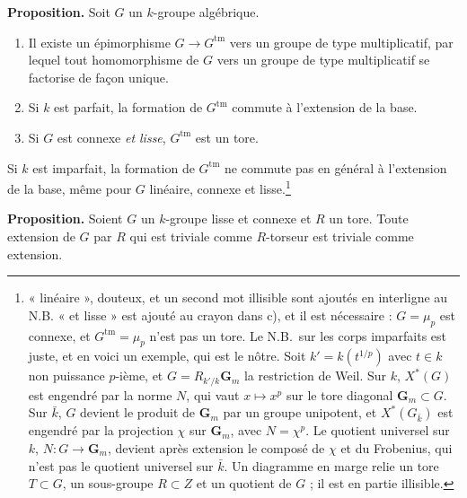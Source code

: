 \documentclass[11pt,a4paper]{article}
\begin{document}
\textbf{Proposition.} Soit $G$ un $k$-groupe algébrique.
\begin{enumerate}
\item[a)] Il existe un épimorphisme $G \to G^{\mathrm{tm}}$ vers un groupe de
type multiplicatif, par lequel tout homomorphisme de $G$ vers un groupe de
type multiplicatif se factorise de façon unique.
\item[b)] Si $k$ est parfait, la formation de $G^{\mathrm{tm}}$ commute à
l'extension de la base.
\item[c)] Si $G$ est connexe \emph{et lisse}, $G^{\mathrm{tm}}$ est un tore.
\end{enumerate}
Si $k$ est imparfait, la formation de $G^{\mathrm{tm}}$ ne commute pas en
général à l'extension de la base, même pour $G$ linéaire, connexe et
lisse.\footnote{« linéaire », douteux, et un second mot illisible sont
ajoutés en interligne au N.B. « et lisse » est ajouté au crayon dans c), et il est
nécessaire : $G = \mu_{p}$ est connexe, et $G^{\mathrm{tm}} = \mu_{p}$ n'est
pas un tore. Le N.B.\ sur les corps imparfaits est juste, et en voici un
exemple, qui est le nôtre. Soit $k'= k(t^{1/p})$ avec $t \in k$ non puissance
$p$-ième, et $G = R_{k'/k}\mathbf{G}_{m}$ la restriction de Weil. Sur $k$,
$X^{*}(G)$ est engendré par la norme $N$, qui vaut $x \mapsto x^{p}$ sur le
tore diagonal $\mathbf{G}_{m} \subset G$. Sur $\bar k$, $G$ devient le produit
de $\mathbf{G}_{m}$ par un groupe unipotent, et $X^{*}(G_{\bar k})$ est
engendré par la projection $\chi$ sur $\mathbf{G}_{m}$, avec $N = \chi^{p}$.
Le quotient universel sur $k$, $N : G \to \mathbf{G}_{m}$, devient après
extension le composé de $\chi$ et du Frobenius, qui n'est pas le quotient
universel sur $\bar k$. Un diagramme en marge relie un tore $T \subset G$, un
sous-groupe $R \subset Z$ et un quotient de $G$ ; il est en partie
illisible.}

\textbf{Proposition.} Soient $G$ un $k$-groupe lisse et connexe et $R$ un
tore. Toute extension de $G$ par $R$ qui est triviale comme $R$-torseur est
triviale comme extension.
\end{document}
